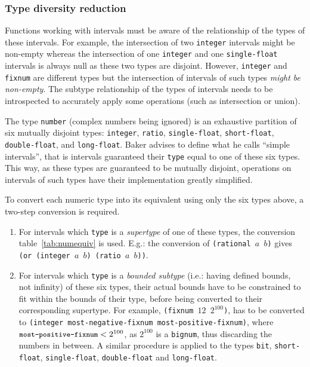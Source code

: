 \documentclass[format=sigconf]{acmart}
\newcommand\code[2][\small]{\sloppy\texttt{#1#2}}
\newcommand\mcode[2][\small]{\text{\code[#1]{#2}}}
\theoremstyle{definition}
\begin{document}
\subsubsection{Type diversity reduction}
Functions working with intervals must be aware of the relationship of the types
of these intervals. For example, the intersection of two \code{integer}
intervals might be non-empty whereas the intersection of one \code{integer} and
one \code{single-float} intervals is always null as these two types are disjoint.
However, \code{integer} and \code{fixnum} are different types but the
intersection of intervals of such types \emph{might be non-empty}.
The subtype relationship of the types of intervals needs to be introspected to
accurately apply some operations (such as intersection or union).

The type \code{number} (complex numbers being ignored) is an exhaustive
partition of six mutually disjoint types: \code{integer}, \code{ratio},
\code{single-float}, \code{short-float}, \code{double-float}, and
\code{long-float}.
Baker advises to define what he calls ``simple intervals'', that is intervals
guaranteed their \code{type} equal to one of these six types. This way, as these
types are guaranteed to be mutually disjoint, operations on intervals of such
types have their implementation greatly simplified.

To convert each numeric type into its equivalent using only the six types above,
a two-step conversion is required.
\begin{enumerate}
\item For intervals which \code{type} is a \emph{supertype} of one of these
  types, the conversion table~\ref{tab:numequiv} is used. E.g.: the conversion
  of \code{(rational $a$ $b$)} gives \code{(or (integer $a$ $b$) (ratio $a$
    $b$))}.
\item For intervals which \code{type} is a \emph{bounded subtype} (i.e.: having
  defined bounds, not infinity) of these six types, their actual bounds have to
  be constrained to fit within the bounds of their type, before being converted
  to their corresponding supertype. For example, \code{(fixnum $12$ $2^{100}$)},
  has to be converted to \code{(integer most-negative-fixnum
    most-positive-fixnum)}, where $\mcode{most-positive-fixnum} < 2^{100}$, as
  $2^{100}$ is a \code{bignum}, thus discarding the numbers in between.
  A similar procedure is applied to the types \code{bit}, \code{short-float},
  \code{single-float}, \code{double-float} and \code{long-float}.
\end{enumerate}
\end{document}
